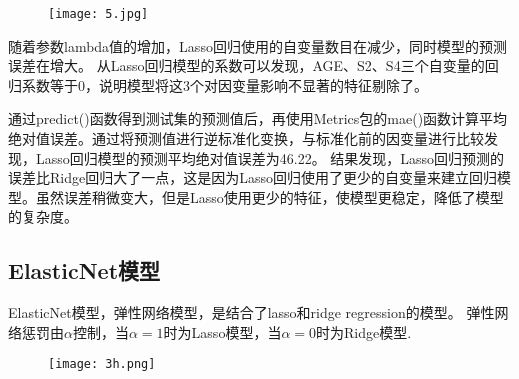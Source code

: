 \documentclass[12pt]{article}
\begin{document}
\begin{figure}[htbp]
	\centering
	\texttt{[image: 5.jpg]}
\end{figure}

随着参数lambda值的增加，Lasso回归使用的自变量数目在减少，同时模型的预测误差在增大。
从Lasso回归模型的系数可以发现，AGE、S2、S4三个自变量的回归系数等于0，说明模型将这3个对因变量影响不显著的特征剔除了。

通过predict()函数得到测试集的预测值后，再使用Metrics包的mae()函数计算平均绝对值误差。通过将预测值进行逆标准化变换，与标准化前的因变量进行比较发现，Lasso回归模型的预测平均绝对值误差为46.22。
结果发现，Lasso回归预测的误差比Ridge回归大了一点，这是因为Lasso回归使用了更少的自变量来建立回归模型。虽然误差稍微变大，但是Lasso使用更少的特征，使模型更稳定，降低了模型的复杂度。

\subsection{ElasticNet模型}

ElasticNet模型，弹性网络模型，是结合了lasso和ridge regression的模型。
弹性网络惩罚由$\alpha$控制，当$\alpha=1$时为Lasso模型，当$\alpha=0$时为Ridge模型.

\begin{figure}[htbp]
	\centering
	\texttt{[image: 3h.png]}
\end{figure}



\end{document}
